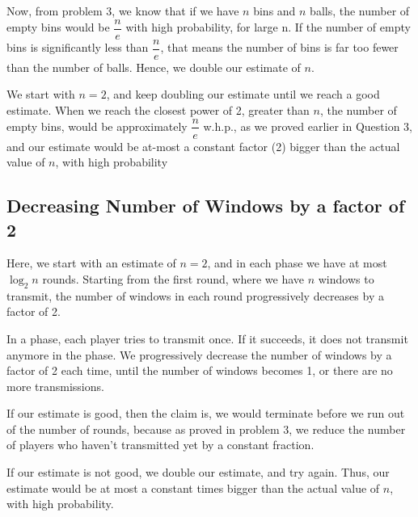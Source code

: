 \documentclass{article}
\begin{document}
Now, from problem 3, we know that if we have $n$ bins and $n$ balls, the number of empty
bins would be $\dfrac{n}{e}$ with high probability, for large n. If the
number of empty bins is significantly less than $\dfrac{n}{e}$, that means
the number of bins is far too fewer than the number of balls. Hence, we 
double our estimate of $n$.

We start with $n = 2$, and keep doubling our estimate until we reach a good
estimate. When we reach the closest power of 2, greater than $n$, the 
number of empty bins, would be approximately $\dfrac{n}{e}$ w.h.p., as we proved earlier
in Question 3, and our estimate would be at-most a constant factor (2) bigger
than the actual value of $n$, with high probability

\subsection{Decreasing Number of Windows by a factor of 2}
Here, we start with an estimate of $n = 2$, and in each phase we have at most $\log_2{n}$
rounds. Starting from the first round, where we have $n$ windows to transmit, 
the number of windows in each round progressively decreases by a factor of 2.

In a phase, each player tries to transmit once. If it succeeds, it does not
transmit anymore in the phase. We progressively decrease the number of windows 
by a factor of 2 each time, until the number of windows becomes 1, or there are 
no more transmissions.

If our estimate is good, then the claim is, we would terminate before we run out
of the number of rounds, because as proved in problem 3, we reduce the number of
players who haven't transmitted yet by a constant fraction.

If our estimate is not good, we double our estimate, and try again. Thus, our 
estimate would be at most a constant times bigger than the actual value of $n$,
with high probability.
\end{document}

